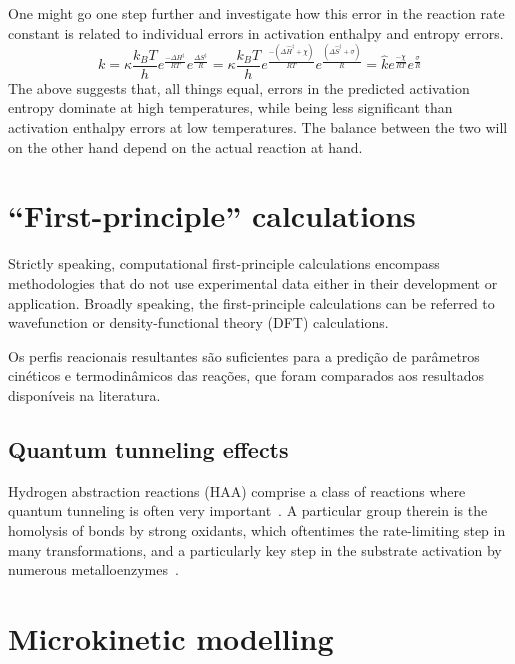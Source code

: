 One might go one step further and investigate how this error in the reaction rate constant
is related to individual errors in activation enthalpy and entropy errors.
%
\begin{equation}
	k = \kappa \frac{k_B T}{h} e^\frac{- \Delta H^\ddagger}{R T}
	e^\frac{  \Delta S^\ddagger}{R}
	= \kappa \frac{k_B T}{h} e^\frac{- \left(\Delta \widehat{H}^\ddagger + \chi\right)}{R T}
	e^\frac{        \left(\Delta \widehat{S}^\ddagger + \sigma\right)}{R}
	= \widehat{k}
	e^\frac{- \chi}{R T}
	e^\frac{  \sigma}{R}
\end{equation}
%
The above suggests that, all things equal,
errors in the predicted activation entropy dominate at high temperatures,
while being less significant
than activation enthalpy errors at low temperatures.
The balance between the two will on the other hand depend on the actual reaction at hand.

\section{``First-principle'' calculations}

Strictly speaking, computational first-principle calculations encompass
methodologies that do not use experimental data either in their development or
application.
Broadly speaking, the first-principle calculations can be referred to
wavefunction or density-functional theory (DFT) calculations.

Os perfis reacionais resultantes são suficientes para a predição de parâmetros
cinéticos e termodinâmicos das reações, que foram comparados aos resultados
disponíveis na literatura. %

\subsection{Quantum tunneling effects}

Hydrogen abstraction reactions (HAA) comprise a class of reactions where
quantum tunneling is often very important~\cite{Bim2018}.
A particular group therein is the homolysis of  bonds by strong
oxidants, which oftentimes the rate-limiting step in many transformations, and
a particularly key step in the substrate activation by numerous
metalloenzymes~\cite{Bim2018}.

\section{Microkinetic modelling}

